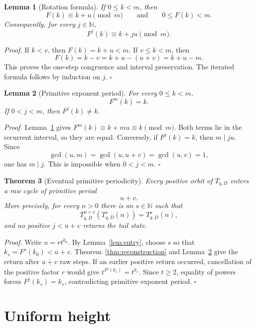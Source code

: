 \documentclass[11pt,letterpaper]{article}
\newcommand{\N}{\mathbb{N}}
\newtheorem{theorem}{Theorem}
\newtheorem{lemma}[theorem]{Lemma}
\newenvironment{proof}{\noindent\textit{Proof.}}{\hfill\(\square\)}
\begin{document}
\begin{lemma}[Rotation formula]
\label{lem:rotation}
If $0\leq k<m$, then
\[
 F(k)\equiv k+u\pmod m
 \qquad\text{and}\qquad 0\leq F(k)<m.
\]
Consequently, for every $j\in\N$,
\[
 F^j(k)\equiv k+ju\pmod m.
\]
\end{lemma}

\begin{proof}
If $k<v$, then $F(k)=k+u<m$.  If $v\leq k<m$, then
\[
 F(k)=k-v=k+u-(u+v)=k+u-m.
\]
This proves the one-step congruence and interval preservation.  The iterated
formula follows by induction on $j$.
\end{proof}

\begin{lemma}[Primitive exponent period]
\label{lem:primitive-exponent}
For every $0\leq k<m$,
\[
 F^m(k)=k.
\]
If $0<j<m$, then $F^j(k)\neq k$.
\end{lemma}

\begin{proof}
Lemma~\ref{lem:rotation} gives
$F^m(k)\equiv k+mu\equiv k\pmod m$.  Both terms lie in the recurrent
interval, so they are equal.  Conversely, if $F^j(k)=k$, then
$m\mid ju$.  Since
\[
 \gcd(u,m)=\gcd(u,u+v)=\gcd(u,v)=1,
\]
one has $m\mid j$.  This is impossible when $0<j<m$.
\end{proof}

\begin{theorem}[Eventual primitive periodicity]
\label{thm:periodicity}
Every positive orbit of $T_{q,D}$ enters a raw cycle of primitive period
\[
 u+v.
\]
More precisely, for every $n>0$ there is an $s\in\N$ such that
\[
 T_{q,D}^{u+v}(T_{q,D}^s(n))=T_{q,D}^s(n),
\]
and no positive $j<u+v$ returns the tail state.
\end{theorem}

\begin{proof}
Write $n=rt^{k_0}$.  By Lemma~\ref{lem:entry}, choose $s$ so that
$k_s=F^s(k_0)<u+v$.  Theorem~\ref{thm:reconstruction} and
Lemma~\ref{lem:primitive-exponent} give the return after $u+v$ raw steps.
If an earlier positive return occurred, cancellation of the positive factor
$r$ would give $t^{F^j(k_s)}=t^{k_s}$.  Since $t\geq2$, equality of powers
forces $F^j(k_s)=k_s$, contradicting primitive exponent period.
\end{proof}

\section{Uniform height}
\end{document}
